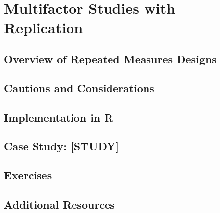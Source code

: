 
\chapter{Multifactor Studies with Replication}

\section{Overview of Repeated Measures Designs}

\section{Cautions and Considerations}

\section{Implementation in R}

\section{Case Study: [STUDY]}

\section{Exercises}

\section{Additional Resources}
